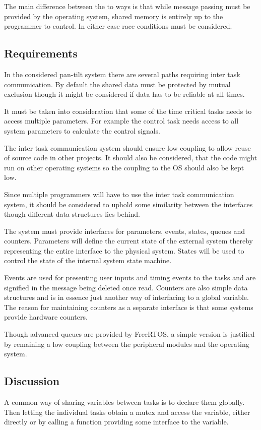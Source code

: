 The main difference between the to ways is that while message passing must be
provided by the operating system, shared memory is entirely up to the programmer
to control. In either case race conditions must be considered.

\subsection{Requirements}
In the considered pan-tilt system there are several paths requiring inter task
communication. By default the shared data must be protected by mutual exclusion
though it might be considered if data has to be reliable at all times. 

 It must be taken into consideration that some of the time critical tasks needs
 to access multiple parameters. For example the control task needs access to all
 system parameters to calculate the control signals.
 
 The inter task communication system should ensure low coupling to allow reuse
 of source code in other projects. It should also be considered, that the code
 might run on other operating systems so the coupling to the OS should also be kept
 low.
 
 Since multiple programmers will have to use the inter task communication
 system, it should be considered to uphold some similarity between the
 interfaces though different data structures lies behind.
 
 The system must provide interfaces for parameters, events, states, queues
and counters. Parameters will define the current state of the external system
thereby representing the entire interface to the physical system. States will be
used to control the state of the internal system state machine.

Events are used for presenting user inputs and timing events to the tasks and
are signified in the message being deleted once read. Counters are also simple
data structures and is in essence just another way of interfacing to a global
variable. The reason for maintaining counters as a separate interface is that
some systems provide hardware counters.

Though advanced queues are provided by FreeRTOS, a simple version is justified by
remaining a low coupling between the peripheral modules and the operating
system.

\subsection{Discussion}
A common way of sharing variables between tasks is to declare them globally.
Then letting the individual tasks obtain a mutex and access the variable, either
directly or by calling a function providing some interface to the variable.

